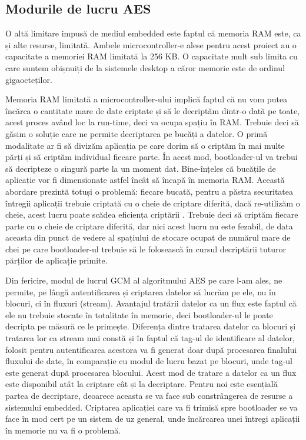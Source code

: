 \documentclass[12pt,a4paper,titlepage]{report}
\begin{document}
\subsection{Modurile de lucru AES}

O altă limitare impusă de mediul embedded este faptul că memoria RAM este, ca și alte resurse, limitată. Ambele microcontroller-e alese pentru acest proiect au o capacitate a memoriei RAM limitată la 256 KB. O capacitate mult sub limita cu care suntem obișnuiți de la sistemele desktop a căror memorie este de ordinul gigaocteților.

Memoria RAM limitată a microcontroller-ului implică faptul că nu vom putea încărca o cantitate mare de date criptate și să le decriptăm dintr-o dată pe toate, acest proces având loc la run-time, deci va ocupa spațiu în RAM. Trebuie deci să găsim o soluție care ne permite decriptarea pe bucăți a datelor. O primă modalitate ar fi să divizăm aplicația pe care dorim să o criptăm în mai multe părți și să criptăm individual fiecare parte. În acest mod, bootloader-ul va trebui să decripteze o singură parte la un moment dat. Bine-înțeles că bucățile de aplicație vor fi dimensionate astfel încât să încapă în memoria RAM. Această abordare prezintă totuși o problemă: fiecare bucată, pentru a păstra securitatea întregii aplicații trebuie criptată cu o cheie de criptare diferită, dacă re-utilizăm o cheie, acest lucru poate scădea eficiența criptării \cite{aesRelatedKey}. Trebuie deci să criptăm fiecare parte cu o cheie de criptare diferită, dar nici acest lucru nu este fezabil, de data aceasta din punct de vedere al spațiului de stocare ocupat de numărul mare de chei pe care bootloader-ul trebuie să le folosească în cursul decriptării tuturor părților de aplicație primite.

Din fericire, modul de lucrul GCM al algoritmului AES pe care l-am ales, ne permite, pe lângă autentificarea și criptarea datelor să lucrăm pe ele, nu în blocuri, ci în fluxuri (stream). Avantajul tratării datelor ca un flux este faptul că ele nu trebuie stocate în totalitate în memorie, deci bootloader-ul le poate decripta pe măsură ce le primește.
Diferența dintre tratarea datelor ca blocuri și tratarea lor ca stream mai constă și în faptul că tag-ul de identificare al datelor, folosit pentru autentificarea acestora va fi generat doar după procesarea finalului fluxului de date, în comparație cu modul de lucru bazat pe blocuri, unde tag-ul este generat după procesarea blocului. Acest mod de tratare a datelor ca un flux este disponibil atât la criptare cât și la decriptare. Pentru noi este esențială partea de decriptare, deoarece aceasta se va face sub constrângerea de resurse a sistemului embedded. Criptarea aplicației care va fi trimisă spre bootloader se va face în mod cert pe un sistem de uz general, unde încărcarea unei întregi aplicații în memorie nu va fi o problemă.
\end{document}

